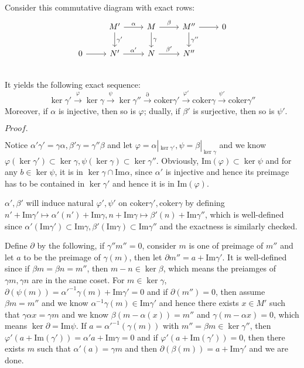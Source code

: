 \documentclass{article}
\newcommand{\Pf}[1]{$Proof.$\par}
\begin{document}
\begin{lemma}
    Consider this commutative diagram with exact rows:
    \[
    \begin{tikzcd}
        & M'\arrow[r,"\alpha"]\arrow[d,"\gamma'"] & M\arrow[r,"\beta"]\arrow[d,"\gamma"] & M''\arrow[r]\arrow[d,"\gamma''"] & 0\\
        0\arrow[r]& N'\arrow[r,"\alpha'"] & N\arrow[r,"\beta'"] & N'' & \\
    \end{tikzcd}
    \]
    It yields the following exact sequence:
    \[\ker\gamma' \overset{\varphi}{\to} \ker\gamma \overset{\psi}{\to} \ker\gamma'' \overset{\partial}{\to} \text{coker}\gamma' \overset{\varphi'}{\to} \text{coker}\gamma \overset{\psi'}{\to} \text{coker}\gamma''\]
    Moreover, if $\alpha$ is injective, then so is $\varphi$; dually, if $\beta'$ is surjective, then so is $\psi'$.
\end{lemma}
\Pf\par
    Notice $\alpha'\gamma' = \gamma\alpha, \beta'\gamma = \gamma''\beta$ and let $\varphi = \alpha|_{\ker\gamma'},\psi = \beta|_{\ker\gamma}$ and we know $\varphi(\ker\gamma') \subset\ker\gamma, \psi(\ker\gamma) \subset \ker\gamma''$. Obviously, $\text{Im}(\varphi) \subset \ker\psi$ and for any $b\in \ker\psi$, it is in $\ker\gamma \cap \text{Im}\alpha$, since $\alpha'$ is injective and hence its preimage has to be contained in $\ker\gamma'$ and hence it is in $\text{Im}(\varphi)$.\par
    $\alpha',\beta'$ will induce natural $\varphi',\psi'$ on $\text{coker}\gamma',\text{coker}\gamma$ by defining $n'+\text{Im}\gamma'\mapsto \alpha'(n')+\text{Im}\gamma, n+\text{Im}\gamma \mapsto \beta'(n)+\text{Im}\gamma''$, which is well-defined since $\alpha'(\text{Im}\gamma') \subset \text{Im}\gamma, \beta'(\text{Im}\gamma)\subset \text{Im}\gamma''$ and the exactness is similarly checked.\par
    Define $\partial$ by the following, if $\gamma'' m'' = 0$, consider $m$ is one of preimage of $m''$ and let $a$ to be the preimage of $\gamma(m)$, then let $\partial m'' = a+\text{Im}\gamma'$. It is well-defined since if $\beta m = \beta n = m''$, then $m-n\in \ker\beta $, which means the preiamges of $\gamma m, \gamma n$ are in the same coset. For $m\in \ker \gamma$, $\partial(\psi(m)) = \alpha'^{-1}\gamma(m) + \text{Im}\gamma' = 0$ and if $\partial(m'') = 0$, then assume $\beta m =m''$ and we know $\alpha^{-1}\gamma(m) \in \text{Im}\gamma'$ and hence there exists $x\in M'$ such that $\gamma\alpha x = \gamma m$ and we know $ \beta(m-\alpha(x)) = m''$ and $\gamma(m-\alpha x) = 0$, which means $\ker \partial = \text{Im}\psi$. If $a = \alpha'^{-1}(\gamma(m))$ with $m'' = \beta m \in \ker \gamma''$, then $\varphi'(a+\text{Im}(\gamma')) = \alpha' a + \text{Im} \gamma = 0$ and if $\varphi'(a+\text{Im}(\gamma')) = 0$, then there exists $m$ such that $\alpha'(a) = \gamma m$ and then $\partial(\beta(m)) = a+\text{Im}\gamma'$ and we are done.
\end{document}
